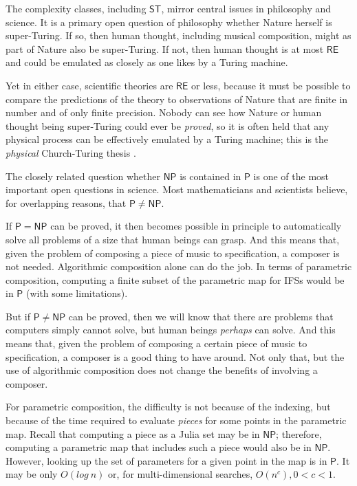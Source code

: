 \documentclass[11pt,papersize=a4]{scrartcl}
\begin{document}
The complexity classes, including $\mathsf{ST}$, mirror central issues in philosophy and science. It is a primary open question of philosophy whether Nature herself is super-Turing. If so, then human thought, including musical composition, might as part of Nature also be super-Turing. If not, then human thought is at most $\mathsf{RE}$ and could be emulated as closely as one likes by a Turing machine. 

Yet in either case, scientific theories are $\mathsf{RE}$ or less, because it must be possible to compare the predictions of the theory to observations of Nature that are finite in number and of only finite precision. Nobody can see how Nature or human thought being super-Turing could ever be \emph{proved}, so it is often held that any physical process can be effectively emulated by a Turing machine; this is the \emph{physical} Church-Turing thesis \parencite{aaronson2005npcomplete, sep-church-turing}.

The closely related question whether $\mathsf{NP}$ is contained in $\mathsf{P}$ is one of the most important open questions in science. Most mathematicians and scientists believe, for overlapping reasons, that $\mathsf{P} \ne \mathsf{NP}$.

If $\mathsf{P} = \mathsf{NP}$  can be proved, it then becomes possible in principle to automatically solve all problems of a size that human beings can grasp. And this means that, given the problem of composing a piece of music to specification, a composer is not needed. Algorithmic composition alone can do the job. In terms of parametric composition, computing a finite subset of the parametric map for IFSs would be in $\mathsf{P}$ (with some limitations).

But if $\mathsf{P} \ne \mathsf{NP}$ can be proved, then we will know that there are problems that computers simply cannot solve, but human beings \emph{perhaps} can solve. And this means that, given the problem of composing a certain piece of music to specification, a composer is a good thing to have around. Not only that, but the use of algorithmic composition does not change the benefits of involving a composer.  

For parametric composition, the difficulty is not because of the indexing, but because of the time required to evaluate  \emph{pieces} for some points in the parametric map. Recall that computing a piece as a Julia set may be in $\mathsf{NP}$; therefore, computing a parametric map that includes such a piece would also be in $\mathsf{NP}$. However, looking up the set of parameters for a given point in the map is in $\mathsf{P}$. It may be only $O(log\ n)$ or, for multi-dimensional searches, $O(n^{c}), 0 < c < 1$.
\end{document}
